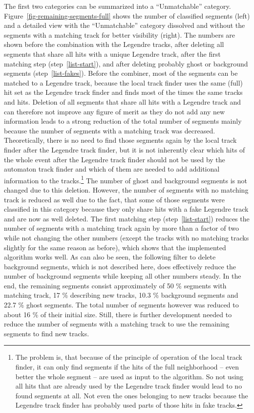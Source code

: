 The first two categories can be summarized into a ``Unmatchable'' category. Figure~\ref{fig-remaining-segments-full} shows the number of classified segments (left) and a detailed view with the ``Unmatchable'' category dissolved and without the segments with a matching track for better visibility (right). The numbers are shown before the combination with the Legendre tracks, after deleting all segments that share all hits with a unique Legendre track, after the first matching step (step~\ref{list-start}), and after deleting probably ghost or background segments (step~\ref{list-fakes}). Before the combiner, most of the segments can be matched to a Legendre track, because the local track finder uses the same (full) hit set as the Legendre track finder and finds most of the times the same tracks and hits. Deletion of all segments that share all hits with a Legendre track and can therefore not improve any figure of merit as they do not add any new information leads to a strong reduction of the total number of segments mainly because the number of segments with a matching track was decreased. Theoretically, there is no need to find those segments again by the local track finder after the Legendre track finder, but it is not inherently clear which hits of the whole event after the Legendre track finder should not be used by the automaton track finder and which of them are needed to add additional information to the tracks.\footnote{The problem is, that because of the principle of operation of the local track finder, it can only find segments if the hits of the full neighborhood -- even better the whole segment -- are used as input to the algorithm. So not using all hits that are already used by the Legendre track finder would lead to no found segments at all. Not even the ones belonging to new tracks because the Legendre track finder has probably used parts of those hits in fake tracks.} The number of ghost and background segments is not changed due to this deletion. However, the number of segments with no matching track is reduced as well due to the fact, that some of those segments were classified in this category because they only share hits with a fake Legendre track and are now as well deleted. The first matching step (step~\ref{list-start}) reduces the number of segments with a matching track again by more than a factor of two while not changing the other numbers (except the tracks with no matching tracks slightly for the same reason as before), which shows that the implemented algorithm works well. As can also be seen, the following filter to delete background segments, which is not described here, does effectively reduce the number of background segments while keeping all other numbers steady. In the end, the remaining segments consist approximately of 50 \% segments with matching track, 17 \% describing new tracks, 10.3 \% background segments and 22.7 \% ghost segments. The total number of segments however was reduced to about 16 \% of their initial size. Still, there is further development needed to reduce the number of segments with a matching track to use the remaining segments to find new tracks.

